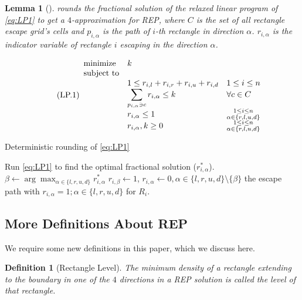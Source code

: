 \documentclass[preprint,12pt]{elsarticle}
\newtheorem{lemma}{Lemma}
\newtheorem{definition}{Definition}
\begin{document}
%
\begin{lemma}[\cite{ma}]\label{lemma:prev}
 rounds the fractional solution of the relaxed linear program of \ref{eq:LP1} to get a $4$-approximation for REP, where $C$ is the set of all rectangle escape grid's cells and $p_{i,\alpha}$ is the path of $i$-th rectangle in direction $\alpha$. $r_{i,\alpha}$ is the indicator variable of rectangle $i$ escaping in the direction $\alpha$.
\end{lemma}
\begin{equation}\tag{LP.1}\label{eq:LP1}
\begin{array}{l l l}
\text{minimize }& k&\\
\text{subject to}&&\\
&1 \leq r_{i,l}+r_{i,r}+r_{i,u}+r_{i,d} & 1\leq i \leq n \\
&\displaystyle\sum_{ p_{i,\alpha}\ni c}  r_{i,\alpha} \leq k & \forall c\in C \\
&r_{i,\alpha} \leq 1 &\substack{ 1\leq i \leq n\\ \alpha \in \lbrace r,l,u,d \rbrace} \\
& r_{i,\alpha}, k \geq 0 &\substack{ 1 \leq i \leq n\\ \alpha \in \lbrace r,l,u,d \rbrace }\*
\end{array}
\end{equation}
%
\begin{algorithm}
\caption{Deterministic rounding of \ref{eq:LP1}~\cite{ma}}
\label{rounding}
\begin{algorithmic}[1]
\Require {}
\Ensure {}
\State Run \ref{eq:LP1} to find the optimal fractional solution ($r^*_{i,\alpha}$).
	\State  $\beta \gets \arg\max_{\alpha \in \lbrace l,r,u,d \rbrace} r^*_{i,\alpha}$
	\State $r_{i,\beta}\gets 1$, $r_{i,\alpha}\gets 0, \alpha\in \lbrace l,r,u,d \rbrace \setminus \lbrace \beta \rbrace$
\EndFor
\State \Return the escape path with $r_{i,\alpha}=1; \alpha \in \lbrace l,r,u,d \rbrace$ for $R_i$.
\end{algorithmic}
\end{algorithm}
\subsection{More Definitions About REP}
We require some new definitions in this paper, which we discuss here.

\begin{definition}[Rectangle Level]\label{def:rlevel}
The minimum density of a rectangle extending to the boundary in one of the $4$ directions in a REP solution is called the level of that rectangle.
\end{definition}
\end{document}
